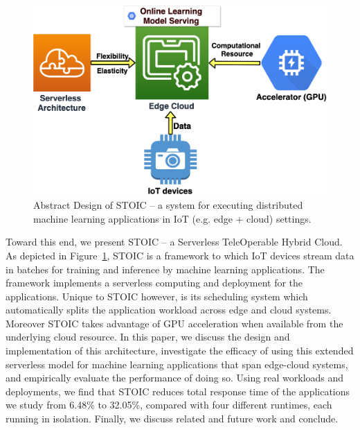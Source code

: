 \begin{figure}
    \centering
    \includegraphics[scale=0.25]{figures/edge}
    \caption{Abstract Design of STOIC -- a system for executing
distributed machine learning applications in IoT (e.g. edge + cloud) settings.
\label{fig:edge}}
\end{figure}

Toward this end, we present STOIC -- a Serverless TeleOperable Hybrid Cloud.
As depicted in Figure~\ref{fig:edge}, STOIC is a framework 
to which
IoT devices stream data in batches for training and inference by
machine learning applications.  The framework implements
a serverless computing and deployment for the applications. Unique to STOIC
however, is its scheduling system which automatically splits the application
workload across edge and cloud systems.  Moreover STOIC takes advantage
of GPU acceleration when available from the underlying cloud resource.  
In this paper, we discuss the design and implementation of this architecture, investigate the efficacy of using this extended serverless model
for machine learning applications that span edge-cloud systems, 
and  empirically evaluate the performance of doing so. Using
real workloads and deployments,  we  find that STOIC reduces total 
response time of the applications we study from 6.48\% to 32.05\%, 
compared with four different runtimes, each running in isolation. 
Finally, we discuss related and future work and conclude.
